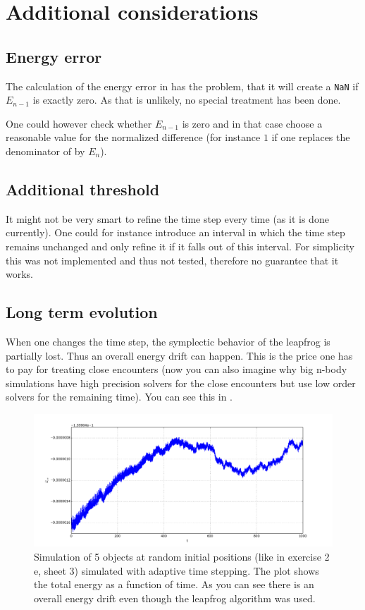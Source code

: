 \documentclass[a4paper,10pt,openany]{article}
\begin{document}
\section{Additional considerations}

\subsection{Energy error}

The calculation of the energy error in  has the problem, that it will create a \verb|NaN| if $E_{n-1}$ is exactly zero. As that is unlikely, no special treatment has been done.

One could however check whether $E_{n-1}$ is zero and in that case choose a reasonable value for the normalized difference (for instance $1$ if one replaces the denominator of  by $E_n$).

\subsection{Additional threshold}

It might not be very smart to refine the time step every time (as it is done currently). One could for instance introduce an interval in which the time step remains unchanged and only refine it if it falls out of this interval. For simplicity this was not implemented and thus not tested, therefore no guarantee that it works.

\subsection{Long term evolution}

When one changes the time step, the symplectic behavior of the leapfrog is partially lost. Thus an overall energy drift can happen. This is the price one has to pay for treating close encounters (now you can also imagine why big n-body simulations have high precision solvers for the close encounters but use low order solvers for the remaining time). You can see this in .

\begin{figure}
\includegraphics[width=\textwidth]{5_bodies_adaptive_step_energy_long_time.png}
\caption{Simulation of 5 objects at random initial positions (like in exercise 2 e, sheet 3) simulated with adaptive time stepping. The plot shows the total energy as a function of time. As you can see there is an overall energy drift even though the leapfrog algorithm was used.}\label{fig:adaptive time stepping long time}
\end{figure}
 
\end{document}
